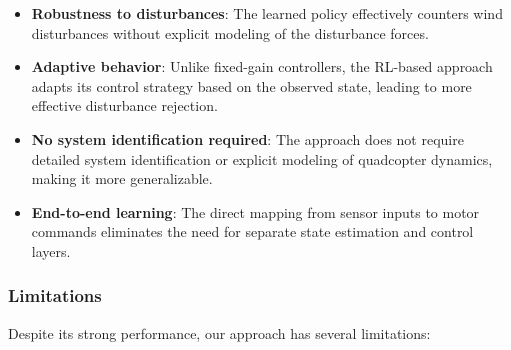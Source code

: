 \documentclass[12pt]{article}
\begin{document}
\begin{itemize}
    \item \textbf{Robustness to disturbances}: The learned policy effectively counters wind disturbances without explicit modeling of the disturbance forces.
    
    \item \textbf{Adaptive behavior}: Unlike fixed-gain controllers, the RL-based approach adapts its control strategy based on the observed state, leading to more effective disturbance rejection.
    
    \item \textbf{No system identification required}: The approach does not require detailed system identification or explicit modeling of quadcopter dynamics, making it more generalizable.
    
    \item \textbf{End-to-end learning}: The direct mapping from sensor inputs to motor commands eliminates the need for separate state estimation and control layers.
\end{itemize}

%     
%     
%     

\subsubsection{Limitations}
Despite its strong performance, our approach has several limitations:

\end{document}
